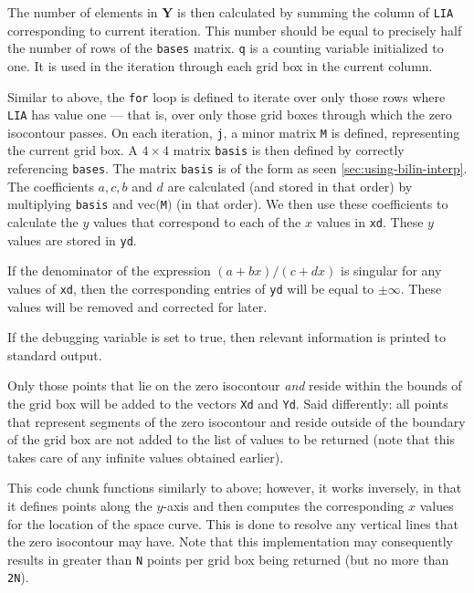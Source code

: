 \documentclass{article}
\begin{document}


The number of elements in $\mathbf{Y}$ is then calculated by
summing the column of \texttt{LIA} corresponding to current
iteration. This number should be equal to precisely half the
number of rows of the \texttt{bases} matrix. \texttt{q} is a
counting variable initialized to one. It is used in the iteration
through each grid box in the current column.

Similar to above, the \texttt{for} loop is defined to iterate
over only those rows where \texttt{LIA} has value one --- that is,
over only those grid boxes through which the zero isocontour
passes. On each iteration, \texttt{j}, a minor matrix \texttt{M}
is defined, representing the current grid box. A $4\times 4$
matrix \texttt{basis} is then defined by correctly referencing
\texttt{bases}. The matrix \texttt{basis} is of the form as seen
\autoref{sec:using-bilin-interp}. The coefficients $a, c, b$ and
$d$ are calculated (and stored in that order) by multiplying
\texttt{basis} and $\mathrm{vec}($\texttt{M}$)$ (in that
order). We then use these coefficients to calculate the $y$ values
that correspond to each of the $x$ values in \texttt{xd}. These
$y$ values are stored in \texttt{yd}. 

If the denominator of the expression $(a+bx)/(c+dx)$ is singular
for any values of \texttt{xd}, then the corresponding entries of
\texttt{yd} will be equal to $\pm \infty$. These values will be
removed and corrected for later. 
\clearpage


If the debugging variable is set to true, then relevant
information is printed to standard output. 



Only those points that lie on the zero isocontour \emph{and}
reside within the bounds of the grid box will be added to the
vectors \texttt{Xd} and \texttt{Yd}. Said differently: all points
that represent segments of the zero isocontour and reside outside
of the boundary of the grid box are not added to the list of
values to be returned (note that this takes care of any infinite
values obtained earlier). 



This code chunk functions similarly to above; however, it works
inversely, in that it defines points along the $y$-axis and then
computes the corresponding $x$ values for the location of the
space curve. This is done to resolve any vertical lines that the
zero isocontour may have. Note that this implementation may
consequently results in greater than \texttt{N} points per grid
box being returned (but no more than \texttt{2N}). 
\end{document}

